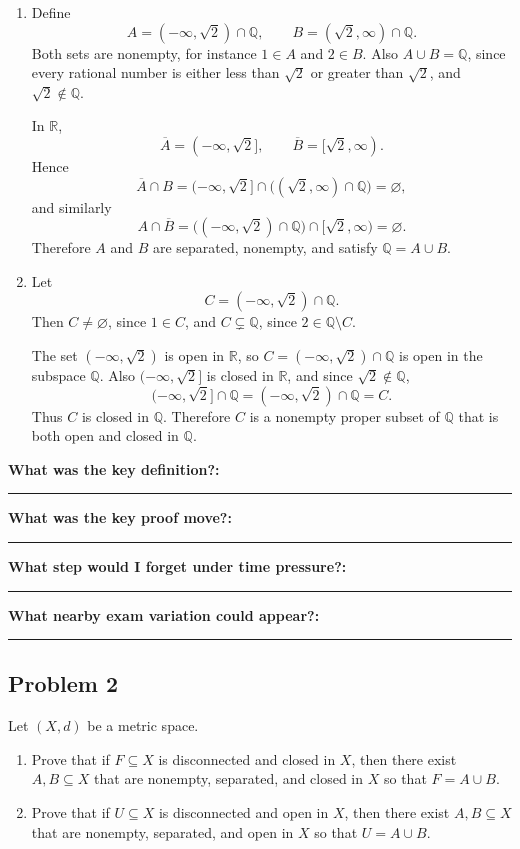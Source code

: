 \documentclass[12pt]{article}
\newcommand{\R}{\mathbb{R}}
\newcommand{\Q}{\mathbb{Q}}
\newcommand{\closure}[1]{\overline{#1}}
\newcommand{\writespace}[1]{\vspace*{#1}}
\newcommand{\fillfieldbig}[2]{%
  \par\noindent\textbf{#1:}\par
  \writespace{#2}
  \noindent\rule{\linewidth}{0.35pt}\par\vspace{0.15in}%
}
\newenvironment{problemstatementbox}[1]{%
  \begin{tcolorbox}[
    enhanced,
    breakable,
    colback=probblue,
    colframe=blue!55!black,
    fonttitle=\bfseries,
    title={Problem Statement\hfill #1}
  ]
}{%
  \end{tcolorbox}
}
\newenvironment{solutionbox}[1]{%
  \begin{tcolorbox}[
    enhanced,
    breakable,
    colback=solgreen,
    colframe=green!45!black,
    fonttitle=\bfseries,
    title={#1}
  ]
}{%
  \end{tcolorbox}
}
\newcommand{\reflectionpage}[1]{%
  \begin{tcolorbox}[
    enhanced,
    colback=reflectcyan,
    colframe=cyan!55!black,
    fonttitle=\bfseries,
    title={Reflection \& Variation\hfill #1},
    height=8.45in
  ]
  \fillfieldbig{What was the key definition?}{1.15in}
  \fillfieldbig{What was the key proof move?}{1.15in}
  \fillfieldbig{What step would I forget under time pressure?}{1.15in}
  \fillfieldbig{What nearby exam variation could appear?}{1.35in}
  \end{tcolorbox}
}
\begin{document}
\newpage
\begin{solutionbox}{Student-Derived Solution (No official solution available)}
\begin{enumerate}[label=(\alph*)]
  \item Define
  \[
    A=(-\infty,\sqrt2)\cap\Q,
    \qquad
    B=(\sqrt2,\infty)\cap\Q.
  \]
  Both sets are nonempty, for instance \(1\in A\) and \(2\in B\). Also \(A\cup B=\Q\), since every rational number is either less than \(\sqrt2\) or greater than \(\sqrt2\), and \(\sqrt2\notin\Q\).

  In \(\R\),
  \[
    \closure{A}=(-\infty,\sqrt2],
    \qquad
    \closure{B}=[\sqrt2,\infty).
  \]
  Hence
  \[
    \closure{A}\cap B
    =
    (-\infty,\sqrt2]\cap\big((\sqrt2,\infty)\cap\Q\big)
    =
    \varnothing,
  \]
  and similarly
  \[
    A\cap\closure{B}
    =
    \big((-\infty,\sqrt2)\cap\Q\big)\cap[\sqrt2,\infty)
    =
    \varnothing.
  \]
  Therefore \(A\) and \(B\) are separated, nonempty, and satisfy \(\Q=A\cup B\).

  \item Let
  \[
    C=(-\infty,\sqrt2)\cap\Q.
  \]
  Then \(C\neq\varnothing\), since \(1\in C\), and \(C\subsetneq\Q\), since \(2\in\Q\setminus C\).

  The set \((-\infty,\sqrt2)\) is open in \(\R\), so \(C=(-\infty,\sqrt2)\cap\Q\) is open in the subspace \(\Q\). Also \((-\infty,\sqrt2]\) is closed in \(\R\), and since \(\sqrt2\notin\Q\),
  \[
    (-\infty,\sqrt2]\cap\Q=(-\infty,\sqrt2)\cap\Q=C.
  \]
  Thus \(C\) is closed in \(\Q\). Therefore \(C\) is a nonempty proper subset of \(\Q\) that is both open and closed in \(\Q\).
\end{enumerate}
\end{solutionbox}

\newpage
\reflectionpage{Homework 11, Problem 1}

\newpage
\subsection{Problem 2}

\begin{problemstatementbox}{Homework 11, Problem 2}
Let \((X,d)\) be a metric space.

\begin{enumerate}[label=(\alph*)]
  \item Prove that if \(F\subseteq X\) is disconnected and closed in \(X\), then there exist \(A,B\subseteq X\) that are nonempty, separated, and closed in \(X\) so that \(F=A\cup B\).
  \item Prove that if \(U\subseteq X\) is disconnected and open in \(X\), then there exist \(A,B\subseteq X\) that are nonempty, separated, and open in \(X\) so that \(U=A\cup B\).
\end{enumerate}
\end{problemstatementbox}
\end{document}
